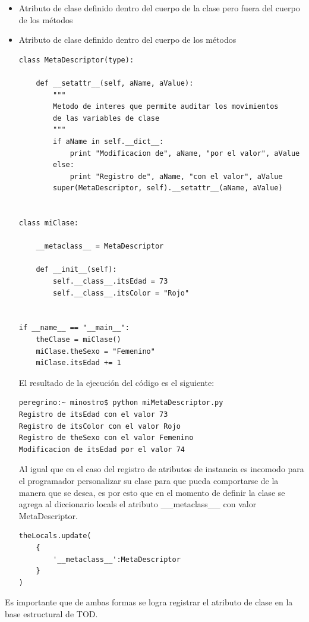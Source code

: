 \documentclass[12pt,legalpaper]{report}
\begin{document}
\begin{itemize}
	\item Atributo de clase definido dentro del cuerpo de la clase pero fuera del cuerpo de los métodos
	\item Atributo de clase definido dentro del cuerpo de los métodos

\begin{singlespace}
\begin{lstlisting}[style=Python]
class MetaDescriptor(type):

    def __setattr__(self, aName, aValue):
        """
        Metodo de interes que permite auditar los movimientos
        de las variables de clase
        """    
        if aName in self.__dict__:
            print "Modificacion de", aName, "por el valor", aValue
        else:
            print "Registro de", aName, "con el valor", aValue
        super(MetaDescriptor, self).__setattr__(aName, aValue)
        
        
class miClase:
    
    __metaclass__ = MetaDescriptor
    
    def __init__(self):
        self.__class__.itsEdad = 73
        self.__class__.itsColor = "Rojo"
    

if __name__ == "__main__":
    theClase = miClase()
    miClase.theSexo = "Femenino"
    miClase.itsEdad += 1
\end{lstlisting}

El resultado de la ejecución del código es el siguiente:

\begin{lstlisting}[style=consola,numbers=none]
peregrino:~ minostro$ python miMetaDescriptor.py
Registro de itsEdad con el valor 73
Registro de itsColor con el valor Rojo
Registro de theSexo con el valor Femenino
Modificacion de itsEdad por el valor 74
\end{lstlisting}

\end{singlespace}

Al igual que en el caso del registro de atributos de instancia es incomodo para el programador personalizar su clase para que pueda comportarse de la manera que se desea, es por esto que en el momento de definir la clase se agrega al diccionario locals el atributo \_\_metaclass\_\_ con valor MetaDescriptor.

\begin{singlespace}
\begin{lstlisting}[style=consola,numbers=none]
theLocals.update(
    {
        '__metaclass__':MetaDescriptor
    }
)
\end{lstlisting}
\end{singlespace}
\end{itemize}
Es importante que de ambas formas se logra registrar el atributo de clase en la base estructural de TOD.
\end{document}

